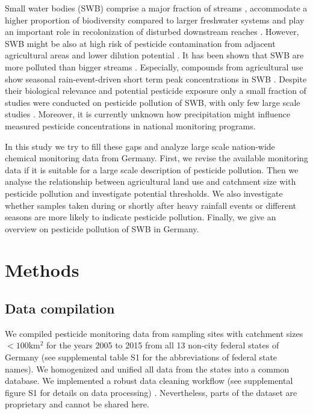 \documentclass[journal=esthag,manuscript=article]{achemso}
\begin{document}
Small water bodies (SWB) comprise a major fraction of streams \citep{nadeau_hydrological_2007}, accommodate a higher proportion of biodiversity compared to larger freshwater systems \citep{davies_comparison_2008, biggs_report_2014} and play an important role in recolonization of disturbed downstream reaches \citep{liess_analyzing_2005, orlinskiy_forested_2015}.
However, SWB might be also at high risk of pesticide contamination from adjacent agricultural areas and lower dilution potential \citep{schulz_field_2004,liess_determination_1999}.
It has been shown that SWB are more polluted than bigger streams \citep{stehle_pesticide_2015,schulz_field_2004}.
Especially, compounds from agricultural use show seasonal rain-event-driven short term peak concentrations in SWB \citep{wittmer_significance_2010}.
Despite their biological relevance and potential pesticide exposure only a small fraction of studies were conducted on pesticide pollution of SWB, with only few large scale studies \citep{lorenz_specifics_2016}. 
Moreover, it is currently unknown how precipitation might influence measured pesticide concentrations in national monitoring programs.

In this study we try to fill these gaps and analyze large scale nation-wide chemical monitoring data from Germany.
First, we revise the available monitoring data if it is suitable for a large scale description of pesticide pollution.
Then we analyse the relationship between agricultural land use and catchment size with pesticide pollution and investigate potential thresholds.
We also investigate whether samples taken during or shortly after heavy rainfall events or different seasons are more likely to indicate pesticide pollution.
Finally, we give an overview on pesticide pollution of SWB in Germany.





\section{Methods}
\subsection{Data compilation}
We compiled pesticide monitoring data from sampling sites with catchment sizes $\mathrm{< 100km^2}$ for the years 2005 to 2015 from all 13 non-city federal states of Germany (see supplemental table S1 for the abbreviations of federal state names). 
We homogenized and unified all data from the states into a common database.
We implemented a robust data cleaning workflow (see supplemental figure S1 for details on data processing) \citep{poisot_best_2015}.
Nevertheless, parts of the dataset are proprietary and cannot be shared here.
\end{document}
